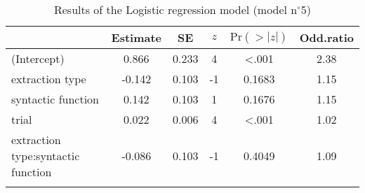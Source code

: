 \begin{table}[h]
\begin{tabularx}{\textwidth}{Q S[table-format=-1.3] S[table-format=1.3] S[table-format=-1] S[table-format=<1.4] S[table-format=1.2]}
  \lsptoprule
 & {Estimate} & {SE} & {$z$} & {$\text{Pr}(>|z|)$} & {Odd.ratio} \\ 
  \midrule
  (Intercept) & 0.866 & 0.233 & 4 & <.001 & 2.38 \\ 
  extraction type & -0.142 & 0.103 & -1 & 0.1683 & 1.15 \\ 
  syntactic function & 0.142 & 0.103 & 1 & 0.1676 & 1.15 \\ 
  trial & 0.022 & 0.006 & 4 & <.001 & 1.02 \\ 
  extraction type:syntactic function & -0.086 & 0.103 & -1 & 0.4049 & 1.09 \\ 
   \lspbottomrule
\end{tabularx}
\caption{Results of the Logistic regression model (model n$^{\circ}$5)}
\label{tab:exp02-m5}
\end{table}

